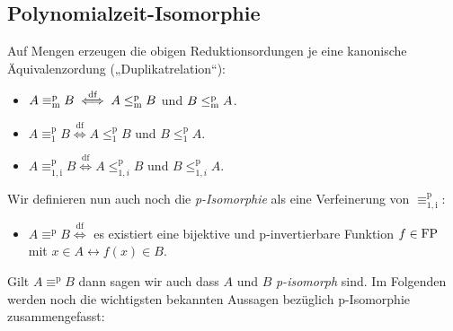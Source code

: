 \subsection*{Polynomialzeit-Isomorphie}
Auf Mengen erzeugen die obigen Reduktionsordungen je eine kanonische Äquivalenzordung („Duplikatrelation“):
\begin{itemize}
\item $A\equiv_\mathrm{m}^\mathrm{p} B \stackrel{\text{df}}{\iff} A\leq_\mathrm{m}^\mathrm{p} B$ und $B\leq_\mathrm{m}^\mathrm{p} A$.
\item $A\equiv_\mathrm{1}^\mathrm{p} B \stackrel{\text{df}}{\iff} A\leq_1^\mathrm{p} B$ und $B\leq_1^\mathrm{p} A$.
\item $A\equiv_\mathrm{1,i}^\mathrm{p} B \stackrel{\text{df}}{\iff} A\leq_{1,i}^\mathrm{p} B$ und $B\leq_{1,i}^\mathrm{p} A$.
\end{itemize}
Wir definieren nun auch noch die \emph{p-Isomorphie} als eine Verfeinerung von $\equiv_\mathrm{1,i}^\mathrm{p}$:
\begin{itemize}
    \item $A\equiv^\mathrm{p} B \stackrel{\text{df}}{\iff}$ es existiert eine bijektive und p-invertierbare Funktion $f\in\mathrm{FP}$ mit $x\in A\leftrightarrow f(x)\in B$.
\end{itemize}
Gilt $A\equiv^\mathrm{p} B$ dann sagen wir auch dass $A$ und $B$ \emph{p-isomorph} sind.
Im Folgenden werden noch die wichtigsten bekannten Aussagen bezüglich p-Isomorphie zusammengefasst:

